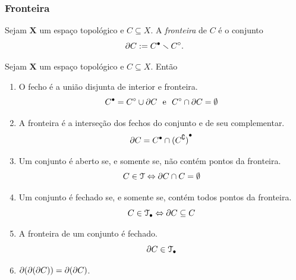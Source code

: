 \subsubsection{Fronteira}

\begin{definition}
	Sejam $\bm X$ um espaço topológico e $C \subseteq X$. A \emph{fronteira} de $C$ é o conjunto
	\begin{equation*}
	\partial{C} := {C}^\bullet \smallsetminus {C}^\circ.
	\end{equation*}
\end{definition}

\begin{exercise}
	Sejam $\bm X$ um espaço topológico e $C \subseteq X$. Então
	\begin{enumerate}
	\item O fecho é a união disjunta de interior e fronteira.
	\begin{equation*}
	{C}^\bullet = {C}^\circ \cup \partial{C} \text{\ \ e\ \ } {C}^\circ \cap \partial{C} = \emptyset
	\end{equation*}
	\item A fronteira é a interseção dos fechos do conjunto e de seu complementar.
	\begin{equation*}
	\partial{C} = {C}^\bullet \cap {(C^\complement)}^\bullet
	\end{equation*}
	\item Um conjunto é aberto se, e somente se, não contém pontos da fronteira.
	\begin{equation*}
	C \in \mathcal{T} \Leftrightarrow \partial{C} \cap C = \emptyset
	\end{equation*}
	\item Um conjunto é fechado se, e somente se, contém todos pontos da fronteira.
	\begin{equation*}
	C \in \mathcal{T}_{\bullet} \Leftrightarrow \partial{C} \subseteq C
	\end{equation*}
	\item A fronteira de um conjunto é fechado.
	\begin{equation*}
	\partial{C} \in \mathcal{T}_{\bullet}
	\end{equation*}
	\item $\partial{(\partial{(\partial{C})})} = \partial{(\partial{C})}$.
	\end{enumerate}
\end{exercise}


